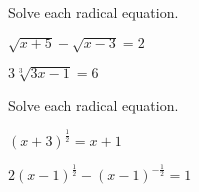 \vfill
\begin{center} \hfill
\end{center}

\begin{exercise}
		Solve each radical equation.

	\begin{enumerate*}[label={(\arabic*)~}]
		\item $\sqrt{x+5}-\sqrt{x-3}=2$
		\item $3\sqrt[3]{3x-1}=6$
		\hfill\null
	\end{enumerate*}
\end{exercise}


\vfill
\begin{center} \hfill
\end{center}

\newpage 

\begin{exercise}
	Solve each radical equation.

\begin{enumerate*}[label={(\arabic*)~}]
	\item $(x+3)^{\frac12}=x+1$
	\item $2(x-1)^{\frac12}-(x-1)^{-\frac12}=1$
	\hfill\null
\end{enumerate*}
\end{exercise}


\vfill
\begin{center} \hfill
{}
\end{center}

